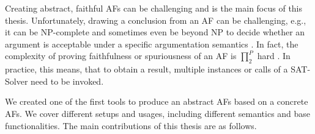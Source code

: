 Creating abstract, faithful AFs can be challenging and is the main focus of this thesis. Unfortunately, drawing a conclusion from an AF can be challenging, e.g., it can be NP-complete and sometimes even be beyond NP to decide whether an argument is acceptable under a specific argumentation semantics \cite{DBLP:journals/ai/DvorakGRW23}. In fact, the complexity of proving faithfulness or spuriousness of an AF is $\prod_2^P$ hard \cite{DBLP:conf/kr/SaribaturW21}. In practice, this means, that to obtain a result, multiple instances or calls of a SAT-Solver need to be invoked.

We created one of the first tools to produce an abstract AFs based on a concrete AFs. We cover different setups and usages, including different semantics and base functionalities. The main contributions of this thesis are as follows.

